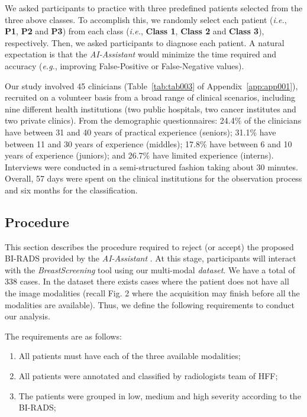 We asked participants to practice with three predefined patients selected from the three above classes. To accomplish this, we randomly select each patient ({\it i.e.}, {\bf P1}, {\bf P2} and {\bf P3}) from each class ({\it i.e.}, {\bf Class 1}, {\bf Class 2} and {\bf Class 3}), respectively.
Then, we asked participants to diagnose each patient.
A natural expectation is that the {\it AI-Assistant} would minimize the time required and accuracy ({\it e.g.}, improving False-Positive or False-Negative values).

Our study involved 45 clinicians (Table~\ref{tab:tab003} of Appendix~\ref{app:app001}), recruited on a volunteer basis from a broad range of clinical scenarios, including nine different health institutions (two public hospitals, two cancer institutes and two private clinics).
From the demographic questionnaires:
24.4\% of the clinicians have between 31 and 40 years of practical experience (seniors);
31.1\% have between 11 and 30 years of experience (middles);
17.8\% have between 6 and 10 years of experience (juniors); and
26.7\% have limited experience (interns).
Interviews were conducted in a semi-structured fashion taking about 30 minutes.
Overall, 57 days were spent on the clinical institutions for the observation process and six months for the classification.

\subsection{Procedure}
\label{sec:procedure}

This section describes the procedure required to reject (or accept) the proposed BI-RADS provided by the {\it AI-Assistant} \cite{https://doi.org/10.13140/rg.2.2.16566.14403/1}.
At this stage, participants will interact with the {\it Breast\-Screening} tool using our multi-modal {\em dataset}. We have a total of 338 cases. 
In the dataset there exists cases where the patient does not have all the image modalities (recall Fig. 2 where the acquisition may finish before all the modalities are available).
Thus, we define the following requirements to conduct our analysis.

\hfill

\noindent
The requirements are as follows:

\begin{enumerate}
\item All patients must have each of the three available modalities;
\item All patients were annotated and classified by radiologists team of HFF;
\item The patients were grouped in low, medium and high severity according to the BI-RADS;
\end{enumerate}


